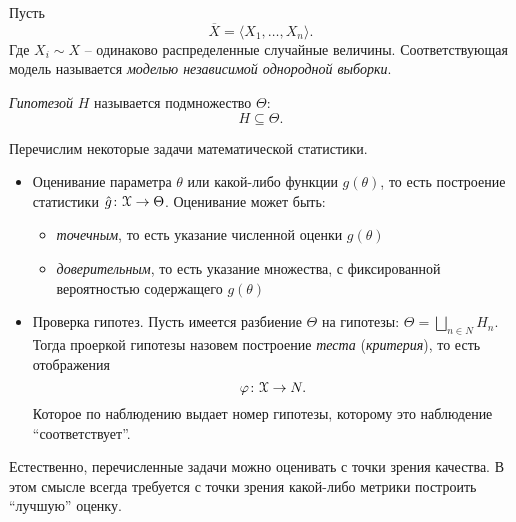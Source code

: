 \begin{definition}
	Пусть
	\[
		\overline{X} = \langle X_1, \ldots, X_n \rangle
	.\]
	Где $X_i \sim X$ -- одинаково распределенные случайные величины.
	Соответствующая модель называется \textit{моделью независимой
	однородной выборки}.
\end{definition}

\begin{definition}
	\textit{Гипотезой} $H$ называется подмножество $\Theta$:
	\[
		H \subseteq \Theta
	.\]
\end{definition}

Перечислим некоторые задачи математической статистики.
\begin{itemize}
	\item Оценивание параметра $\theta$ или какой-либо функции $g(\theta)$,
		то есть построение статистики $\hat{g} \colon \mathcal{X} \to \Theta$.
		Оценивание может быть:
		\begin{itemize}
			\item \textit{точечным}, то есть указание численной оценки
				$g(\theta)$
			\item \textit{доверительным}, то есть указание множества, с
				фиксированной вероятностью содержащего $g(\theta)$
		\end{itemize}
	\item Проверка гипотез. Пусть имеется разбиение $\Theta$ на гипотезы:
		$\Theta = \bigsqcup_{n \in N}{H_n}$. Тогда проеркой гипотезы назовем
		построение \textit{теста} (\textit{критерия}), то есть отображения
		\[
			\varphi \colon \mathcal{X} \to N
		.\]
		Которое по наблюдению выдает номер гипотезы, которому это наблюдение
		``соответствует''.
\end{itemize}

Естественно, перечисленные задачи можно оценивать с точки зрения качества.
В этом смысле всегда требуется с точки зрения какой-либо метрики  построить
``лучшую'' оценку.
